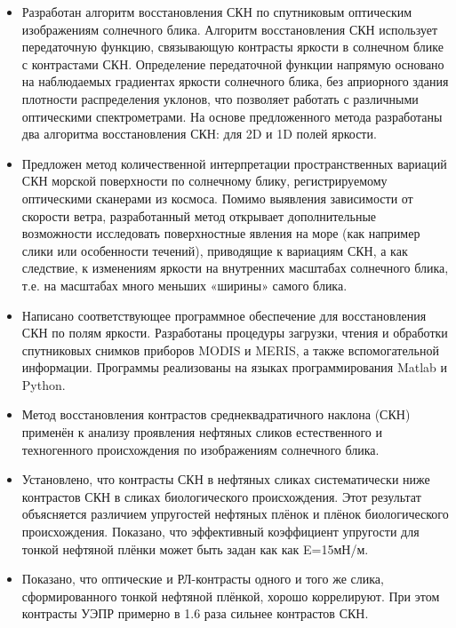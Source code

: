 \begin{itemize}

\item Разработан алгоритм восстановления СКН по спутниковым оптическим изображениям солнечного блика. Алгоритм восстановления СКН использует передаточную функцию, связывающую контрасты яркости в солнечном блике с контрастами СКН. Определение передаточной функции напрямую основано на наблюдаемых градиентах яркости солнечного блика, без априорного здания плотности распределения уклонов, что позволяет работать с различными оптическими спектрометрами. На основе предложенного метода разработаны два алгоритма восстановления СКН: для 2D и 1D полей яркости.

\item Предложен метод количественной интерпретации пространственных вариаций СКН морской поверхности по солнечному блику, регистрируемому оптическими сканерами из космоса. Помимо выявления зависимости от скорости ветра, разработанный метод открывает дополнительные возможности исследовать поверхностные явления на море (как например слики или особенности течений), приводящие к вариациям СКН, а как следствие, к изменениям яркости на внутренних масштабах солнечного блика, т.е. на масштабах много меньших «ширины» самого блика.

\item Написано соответствующее программное обеспечение для восстановления СКН по полям яркости. Разработаны процедуры загрузки, чтения и обработки спутниковых снимков приборов MODIS и MERIS, а также вспомогательной информации. Программы реализованы на языках программирования Matlab и Python.

\item Метод восстановления контрастов среднеквадратичного наклона (СКН) применён к анализу проявления нефтяных сликов естественного и техногенного происхождения по изображениям солнечного блика.

\item Установлено, что контрасты СКН в нефтяных сликах систематически ниже контрастов СКН в сликах биологического происхождения. Этот результат объясняется различием упругостей нефтяных плёнок и плёнок биологического происхождения. Показано, что эффективный коэффициент упругости для тонкой нефтяной плёнки может быть задан как как E=15мН/м.

\item Показано, что оптические и РЛ-контрасты одного и того же слика, сформированного тонкой нефтяной плёнкой, хорошо коррелируют. При этом контрасты УЭПР примерно в 1.6 раза сильнее контрастов СКН.


\end{itemize}

